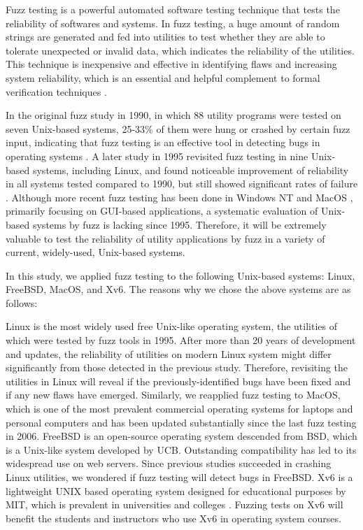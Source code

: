 


Fuzz testing is a powerful automated software testing technique that tests the reliability of softwares and systems. In fuzz testing, a huge amount of random strings are generated and fed into utilities to test whether they are able to tolerate unexpected or invalid data, which indicates the reliability of the utilities. This technique is inexpensive and effective in identifying flaws and increasing system reliability, which is an essential and helpful complement to formal verification techniques \cite{fuzz1990}.

In the original fuzz study in 1990, in which 88 utility programs were tested on seven Unix-based systems, 25-33\% of them were hung or crashed by certain fuzz input, indicating that fuzz testing is an effective tool in detecting bugs in operating systems \cite{fuzz1990}. A later study in 1995 revisited fuzz testing in nine Unix-based systems, including Linux, and found noticeable improvement of reliability in all systems tested compared to 1990, but still showed significant rates of failure \cite{fuzz1995}. Although more recent fuzz testing has been done in Windows NT and MacOS \cite{fuzz2000} \cite{fuzz2006}, primarily focusing on GUI-based applications, a systematic evaluation of Unix-based systems by fuzz is lacking since 1995. Therefore, it will be extremely valuable to test the reliability of utility applications by fuzz in a variety of current, widely-used, Unix-based systems. 

In this study, we applied fuzz testing to the following Unix-based systems: Linux, FreeBSD, MacOS, and Xv6. The reasons why we chose the above systems are as follows:

Linux is the most widely used free Unix-like operating system, the utilities of which were tested by fuzz tools in 1995. After more than 20 years of development and updates, the reliability of utilities on modern Linux system might differ significantly from those detected in the previous study. Therefore, revisiting the utilities in Linux will reveal if the previously-identified bugs have been fixed and if any new flaws have emerged. 
Similarly, we reapplied fuzz testing to MacOS, which is one of the most prevalent commercial operating systems for laptops and personal computers and has been updated substantially since the last fuzz testing in 2006\cite{fuzz2006}. 
FreeBSD is an open-source operating system descended from BSD, which is a Unix-like system developed by UCB. Outstanding compatibility has led to its widespread use on web servers. Since previous studies succeeded in crashing Linux utilities, we wondered if fuzz testing will detect bugs in FreeBSD.
Xv6 is a lightweight UNIX based operating system designed for educational purposes by MIT, which is prevalent in universities and colleges \cite{Xv6page}. Fuzzing tests on Xv6 will benefit the students and instructors who use Xv6 in operating system courses.



